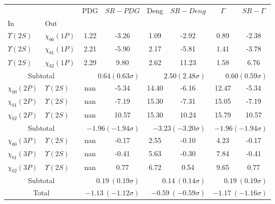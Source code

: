 \begin{tabular}{|l|l|c|c|c|c|c|c|}%
\hline%
&&PDG&$SR-PDG$&Deng&$SR-Deng$&$\Gamma$&$SR-\Gamma$\\%
In&Out&&&&&&\\%
\hline%
$\Upsilon(2S)$&$\chi_{b0}(1P)$&1.22&-3.26&1.09&-2.92&0.89&-2.38\\%
$\Upsilon(2S)$&$\chi_{b1}(1P)$&2.21&-5.90&2.17&-5.81&1.41&-3.78\\%
$\Upsilon(2S)$&$\chi_{b2}(1P)$&2.29&9.80&2.62&11.23&1.58&6.76\\%
\hline%
\hline%
\multicolumn{2}{|c|}{Subtotal}&\multicolumn{2}{|r|}{$0.64 (0.63\sigma)$}&\multicolumn{2}{|r|}{$2.50 (2.48\sigma)$}&\multicolumn{2}{|r|}{$0.60 (0.59\sigma)$}\\%
\hline%
\hline%
$\chi_{b0}(2P)$&$\Upsilon(2S)$&nan&-5.34&14.40&-6.16&12.47&-5.34\\%
$\chi_{b1}(2P)$&$\Upsilon(2S)$&nan&-7.19&15.30&-7.31&15.05&-7.19\\%
$\chi_{b2}(2P)$&$\Upsilon(2S)$&nan&10.57&15.30&10.24&15.79&10.57\\%
\hline%
\hline%
\multicolumn{2}{|c|}{Subtotal}&\multicolumn{2}{|r|}{$-1.96 (-1.94\sigma)$}&\multicolumn{2}{|r|}{$-3.23 (-3.20\sigma)$}&\multicolumn{2}{|r|}{$-1.96 (-1.94\sigma)$}\\%
\hline%
\hline%
$\chi_{b0}(3P)$&$\Upsilon(2S)$&nan&-0.17&2.55&-0.10&4.23&-0.17\\%
$\chi_{b1}(3P)$&$\Upsilon(2S)$&nan&-0.41&5.63&-0.30&7.84&-0.41\\%
$\chi_{b2}(3P)$&$\Upsilon(2S)$&nan&0.77&6.72&0.54&9.65&0.77\\%
\hline%
\hline%
\multicolumn{2}{|c|}{Subtotal}&\multicolumn{2}{|r|}{$0.19~(0.19\sigma)$}&\multicolumn{2}{|r|}{$0.14~(0.14\sigma)$}&\multicolumn{2}{|r|}{$0.19~(0.19\sigma)$}\\%
\hline%
\hline%
\multicolumn{2}{|c|}{Total}&\multicolumn{2}{|r|}{$-1.13~(-1.12\sigma)$}&\multicolumn{2}{|r|}{$-0.59~(-0.59\sigma)$}&\multicolumn{2}{|r|}{$-1.17~(-1.16\sigma)$}\\%
\hline%
\end{tabular}